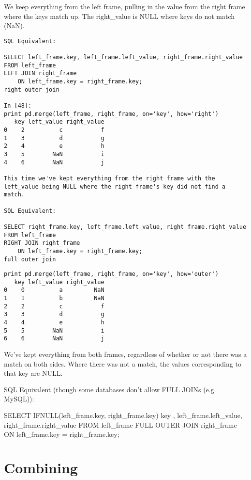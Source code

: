 \begin{framed}
\begin{framed}
\begin{framed}
\begin{framed}
\begin{framed}
\begin{framed}
\begin{framed}
\begin{framed}
\begin{framed}
\begin{framed}
\begin{framed}
\begin{framed}
\begin{framed}
\begin{framed}
\begin{framed}
We keep everything from the left frame, pulling in the value from the right frame where the keys match up. The right_value is NULL where keys do not match (NaN).
\begin{framed}
	\begin{verbatim}
SQL Equivalent:

SELECT left_frame.key, left_frame.left_value, right_frame.right_value
FROM left_frame
LEFT JOIN right_frame
    ON left_frame.key = right_frame.key;
right outer join

In [48]:
print pd.merge(left_frame, right_frame, on='key', how='right')
   key left_value right_value
0    2          c           f
1    3          d           g
2    4          e           h
3    5        NaN           i
4    6        NaN           j

This time we've kept everything from the right frame with the left_value being NULL where the right frame's key did not find a match.

SQL Equivalent:

SELECT right_frame.key, left_frame.left_value, right_frame.right_value
FROM left_frame
RIGHT JOIN right_frame
    ON left_frame.key = right_frame.key;
full outer join
\end{verbatim}



\begin{framed}
\begin{verbatim}
print pd.merge(left_frame, right_frame, on='key', how='outer')
   key left_value right_value
0    0          a         NaN
1    1          b         NaN
2    2          c           f
3    3          d           g
4    4          e           h
5    5        NaN           i
6    6        NaN           j
\end{verbatim}


We've kept everything from both frames, regardless of whether or not there was a match on both sides. Where there was not a match, the values corresponding to that key are NULL.

SQL Equivalent (though some databases don't allow FULL JOINs (e.g. MySQL)):

SELECT IFNULL(left_frame.key, right_frame.key) key
        , left_frame.left_value, right_frame.right_value
FROM left_frame
FULL OUTER JOIN right_frame
    ON left_frame.key = right_frame.key;

\section{Combining}


\end{framed}
\end{framed}
\end{framed}
\end{framed}
\end{framed}
\end{framed}
\end{framed}
\end{framed}
\end{framed}
\end{framed}
\end{framed}
\end{framed}
\end{framed}
\end{framed}
\end{framed}
\end{framed}
\end{framed}
